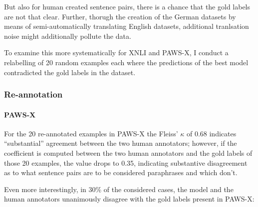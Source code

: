But also for human created sentence pairs, there
is a chance that the gold labels are not that clear. Further, thorugh the creation of the German
datasets by means of semi-automatically translating English datasets, additional tranlsation
noise might additionally pollute the data.

To examine this more systematically for XNLI and PAWS-X, I conduct a relabelling of 20 random
examples each  where the predictions of the best model contradicted the gold labels in the dataset.


\subsubsection{Re-annotation}

\paragraph*{PAWS-X}

For the 20 re-annotated examples in PAWS-X the Fleiss' $\kappa$ of 0.68 indicates ``substantial'' agreement
between the two human annotators; however, if the coefficient is computed between the two human annotators
and the gold labels of those 20 examples, the value drops to 0.35, indicating substantive disagreement
as to what sentence pairs are to be considered paraphrases and which don't.

Even more interestingly, in 30\% of the considered cases, the model and the human annotators unanimously
disagree with the gold labels present in PAWS-X:



